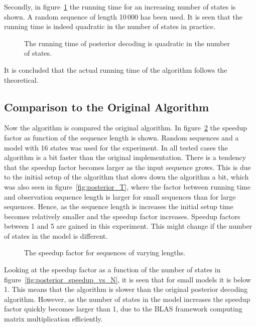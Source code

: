 Secondly, in figure~\ref{fig:posterior_N} the running time for an increasing
number of states is shown. A random sequence of length 10\,000 has been used. It
is seen that the running time is indeed quadratic in the number of states
in practice.

\begin{figure}
  \centering
  
  \caption{The running time of posterior decoding is quadratic in the number of
    states.}
  \label{fig:posterior_N}
\end{figure}

It is concluded that the actual running time of the algorithm follows the
theoretical.

\subsection{Comparison to the Original Algorithm}
\label{sec:comp-class-algor}

Now the algorithm is compared the original algorithm. In
figure~\ref{fig:posterior_speedup_vs_sequence_length} the speedup factor as
function of the sequence length is shown. Random sequences and a model with 16
states was used for the experiment. In all tested cases the algorithm is a bit
faster than the original implementation. There is a tendency that the speedup
factor becomes larger as the input sequence grows. This is due to the initial
setup of the algorithm that slows down the algorithm a bit, which was also seen
in figure~\ref{fig:posterior_T}, where the factor between running time and
observation sequence length is larger for small sequences than for large
sequences. Hence, as the sequence length is increases the initial setup time
becomes relatively smaller and the speedup factor increases. Speedup
factors between 1 and 5 are gained in this experiment. This might change if the
number of states in the model is different.

\begin{figure}
  \centering
  
  \caption{The speedup factor for sequences of varying lengths.}
  \label{fig:posterior_speedup_vs_sequence_length}
\end{figure}

Looking at the speedup factor as a function of the number of states in
figure~\ref{fig:posterior_speedup_vs_N}, it is seen that for small models it is
below 1. This means that the algorithm is slower than the original posterior
decoding algorithm. However, as the number of states in the model increases the
speedup factor quickly becomes larger than 1, due to the BLAS framework
computing matrix multiplication efficiently.

